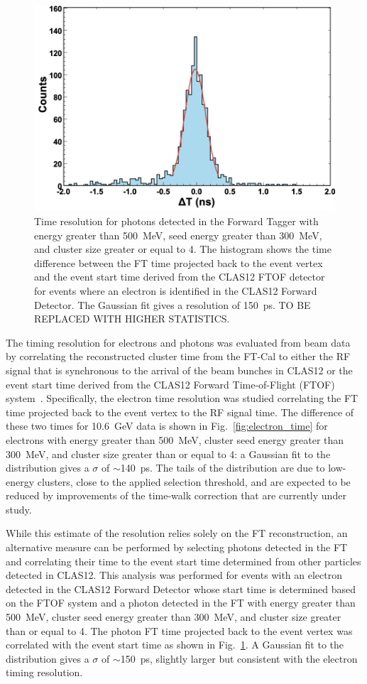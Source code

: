 \begin{figure}[h]
\includegraphics[height=0.6\columnwidth]{fig/ft_gamma_time.png}
\caption{Time resolution for photons detected in the Forward Tagger with energy greater than 500~MeV, seed
  energy greater than 300~MeV, and cluster size greater or equal to 4. The histogram shows the time difference
  between the FT time projected back to the event vertex and the event start time derived from the CLAS12 FTOF
  detector for events where an electron is identified in the CLAS12 Forward Detector. The Gaussian fit gives a
  resolution of 150~ps. TO BE REPLACED WITH HIGHER STATISTICS.}
\label{fig:gamma_time}
\end{figure}

The timing resolution for electrons and photons was evaluated from beam data by correlating the reconstructed
cluster time from the FT-Cal to either the RF signal that is synchronous to the arrival of the beam bunches in
CLAS12 or the event start time derived from the CLAS12 Forward Time-of-Flight (FTOF) system~\cite{ftof}.
Specifically, the electron time resolution was studied correlating the FT time projected back to the event vertex
to the RF signal time. The difference of these two times for 10.6~GeV data is shown in Fig.~\ref{fig:electron_time}
for electrons with energy greater than 500~MeV, cluster seed energy greater than 300~MeV, and cluster size
greater than or equal to 4: a Gaussian fit to the distribution gives a $\sigma$ of $\sim$140~ps. The tails of the
distribution are due to low-energy clusters, close to the applied selection threshold, and are expected to be reduced
by improvements of the time-walk correction that are currently under study.

While this estimate of the resolution relies solely on the FT reconstruction, an alternative measure can be
performed by selecting photons detected in the FT and correlating their time to the event start time determined
from other particles detected in CLAS12. This analysis was performed for events with an electron detected in
the CLAS12 Forward Detector whose start time is determined based on the FTOF system and a photon detected in
the FT with energy greater than 500~MeV, cluster seed energy greater than 300~MeV, and cluster size greater than
or equal to 4. The photon FT time projected back to the event vertex was correlated with the event start time as
shown in Fig.~\ref{fig:gamma_time}. A Gaussian fit to the distribution gives a $\sigma$ of $\sim$150~ps, slightly
larger but consistent with the electron timing resolution.

